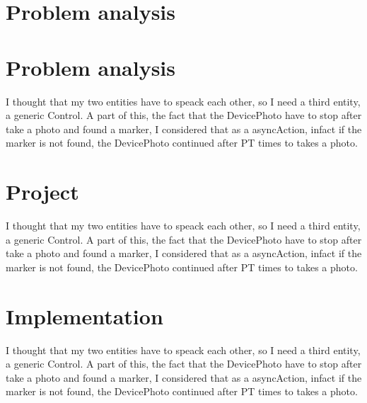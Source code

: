 \documentclass[a4paper]{article}
\begin{document}
\section{Problem analysis }

\section{Problem analysis }
I thought that my two entities have to speack each other, so I need a third entity, a generic Control. A part of this, the fact that the DevicePhoto have to stop after take a photo and found a marker, I considered that as a asyncAction, infact if the marker is not found, the DevicePhoto continued after PT times to takes a photo. 


\section{Project }
I thought that my two entities have to speack each other, so I need a third entity, a generic Control. A part of this, the fact that the DevicePhoto have to stop after take a photo and found a marker, I considered that as a asyncAction, infact if the marker is not found, the DevicePhoto continued after PT times to takes a photo. 

\section{Implementation }
I thought that my two entities have to speack each other, so I need a third entity, a generic Control. A part of this, the fact that the DevicePhoto have to stop after take a photo and found a marker, I considered that as a asyncAction, infact if the marker is not found, the DevicePhoto continued after PT times to takes a photo. 
\end{document}
